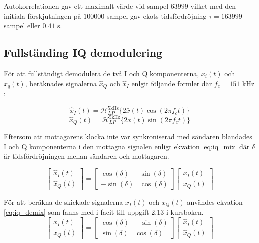 \documentclass[10pt,twocolumn]{article}
\newcommand{\echodelay}{\tau}
\newcommand{\lpfilter}{\mathcal{H}_{LP}^{5 \text{kHz}}}
\begin{document}
Autokorrelationen gav ett maximalt värde vid sampel $63999$ vilket med den initiala förskjutningen på
$100000$ sampel gav ekots tidsfördröjning $\echodelay=163999$ sampel eller $0.41 \text{ s}$.

\subsection{Fullständing IQ demodulering}

För att fullständigt demodulera de två I och Q komponenterna, $x_i(t)$ och $x_q(t)$, beräknades signalerna 
$\hat{x}_Q$ och $\hat{x}_I$ enlgit följande formler där $f_c = 151\text{ kHz}$:

\[
    \hat{x}_I(t) = \lpfilter\{ 2 \bar{x}(t) \cos(2\pi f_c t) \}
\]
\[
    \hat{x}_Q(t) = \lpfilter\{ 2 \bar{x}(t) \sin(2\pi f_c t) \}
\]

Eftersom att mottagarens klocka inte var synkroniserad med sändaren blandades I och Q komponenterna
i den mottagna signalen enligt ekvation \ref{eq:iq_mix} där $\delta$ är tidsfördröjningen mellan sändaren och mottagaren.

\begin{equation}
    \label{eq:iq_mix}
    \left[
        \begin{array}{c}
            \hat{x}_I(t) \\
            \hat{x}_Q(t)
        \end{array}
    \right]
    =
    \left[
        \begin{array}{cc}
            \cos(\delta) & \sin(\delta) \\
            -\sin(\delta) & \cos(\delta)
        \end{array}
    \right]
    \left[
        \begin{array}{c}
            x_I(t) \\
            x_Q(t)
        \end{array}
    \right]
\end{equation}

För att beräkna de skickade signalerna $x_I(t)$ och $x_Q(t)$ användes ekvation \ref{eq:iq_demix} som
fanns med i facit till uppgift 2.13 i kursboken.
\begin{equation}
    \label{eq:iq_demix}
    \left[
        \begin{array}{c}
            x_I(t) \\
            x_Q(t)
        \end{array}
    \right]
    =
    \left[
        \begin{array}{cc}
            \cos(\delta) & -\sin(\delta) \\
            \sin(\delta) & \cos(\delta)
        \end{array}
    \right]
    \left[
        \begin{array}{c}
            \hat{x}_I(t) \\
            \hat{x}_Q(t)
        \end{array}
    \right]
\end{equation}
\end{document}
